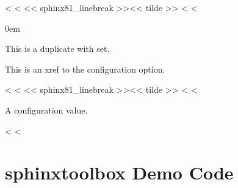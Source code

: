\documentclass[letterpaper,10pt,english]{sphinxmanual}
\begin{document}
\vspace{5px}

\begin{fulllineitems}
<%
\pysigstartsignatures
<%
\pysigline<< sphinx81_linebreak >>{}<< tilde >>
<%
<%
\vspace{-30px}

\begin{DUlineblock}{0em}
\item[]  
\end{DUlineblock}

\vspace{-25px}

This is a duplicate with  set.

\end{fulllineitems}


This is an xref to the {\hyperref[\detokenize{confval:confval-github_repository}]{}} configuration option.

\vspace{5px}

\begin{fulllineitems}
\label{\detokenize{confval:confval-something}}
<%
\pysigstartsignatures
<%
\pysigline<< sphinx81_linebreak >>{}<< tilde >>
<%
<%
\vspace{-25px}

A configuration value.

\end{fulllineitems}

<%
\sphinxstepscope
<%

\chapter{sphinx\sphinxhyphen{}toolbox Demo \sphinxhyphen{} Code}
\label{\detokenize{code-block:sphinx-toolbox-demo-code}}\label{\detokenize{code-block::doc}}
\begin{sphinxVerbatim}[commandchars=\\\{\}]
 
\end{sphinxVerbatim}
\end{document}
